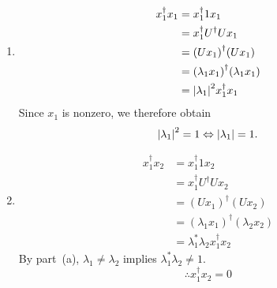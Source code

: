 \item

\begin{enumerate}[wide, labelindent = 0pt, label = (\alph*)]
\item
\begin{align*}
    x_1^\dagger x_1
    &= x_1^\dagger 1 x_1 \\
    &= x_1^\dagger U^\dagger U x_1 \\
    &= {(U x_1)}^\dagger (U x_1) \\
    &= {(\lambda_1 x_1)}^\dagger (\lambda_1 x_1) \\
    &= {\left| \lambda_1 \right|}^2 x_1^\dagger x_1
\end{align*}
Since $x_1$ is nonzero, we therefore obtain
\[
    \left| \lambda_1 \right|^2 = 1
    \Leftrightarrow \left| \lambda_1 \right| = 1.
\]

\item
\begin{align*}
    x_1^\dagger x_2
    &= x_1^\dagger 1 x_2 \\
    &= x_1^\dagger U^\dagger U x_2 \\
    &= {(U x_1)}^\dagger (U x_2) \\
    &= {(\lambda_1 x_1)}^\dagger (\lambda_2 x_2) \\
    &= \lambda_1^* \lambda_2 x_1^\dagger x_2
\end{align*}
By part~(a), $\lambda_1 \neq \lambda_2$ implies $\lambda_1^* \lambda_2 \neq 1$.
\[
    \therefore x_1^\dagger x_2 = 0
\]

\end{enumerate}
